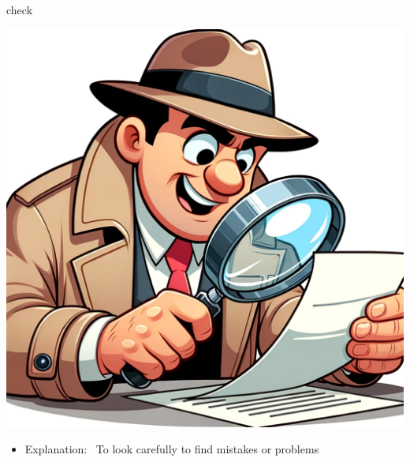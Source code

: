 \documentclass[avery5371, grid,frame]{flashcards}
\begin{document}
\renewcommand{\cardpaper}{a4paper}
\renewcommand{\cardpapermode}{landscape}
\renewcommand{\cardrows}{2}
\renewcommand{\cardcolumns}{2}
\setlength{\cardheight}{3.5in}
\setlength{\cardwidth}{5.0in}
\setlength{\topoffset}{0.50in}
\setlength{\oddoffset}{0.50in}
\setlength{\evenoffset}{0.50in}

\begin{flashcard}{check}
    \vspace*{\fill}
    \begin{center}
        \begin{minipage}[c]{.45\textwidth}
            \includegraphics[width=\textwidth]{cards/c/check/check - a detective with a magnifying glass closely examining a document, searching for clues.png}
        \end{minipage}
        \begin{minipage}[c]{.45\textwidth}
            \begin{itemize}\setlength\itemsep{12pt}
            \item Explanation: \ To look carefully to find mistakes or problems


\end{itemize}
\end{minipage}
\end{center}
\end{flashcard}
\end{document}
